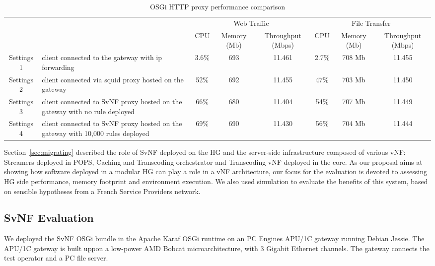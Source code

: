 \begin{table}
	\centering
	\begin{tabular}{| c | p{}|c |c |c || c |c |c |}
	
	
 	    \multicolumn{2}{c}{} & \multicolumn{3}{c}{Web Traffic} 		  & \multicolumn{3}{c}{File Transfer} \\
 	     \cline{3-8}	
             \multicolumn{2}{c|}{} & CPU 			& Memory (Mb) 		& Throughput (Mbps)	& CPU 		& Memory (Mb)		& Throughput (Mbps) \\\hline   
Settings 1 & client connected to the gateway with ip forwarding &   3.6\% 		& 693 		& 11.461		& 2.7\%		& 708 Mb		& 11.455 \\\hline
Settings 2 & client connected via squid proxy hosted on the gateway   &   52\%        & 692 		& 11.455		& 47\%		& 703 Mb		& 11.450 \\\hline
Settings 3 & client connected to SvNF proxy hosted on the gateway with no rule deployed &   66\%		& 680 		& 11.404		& 54\%		& 707 Mb		& 11.449 \\\hline
Settings 4 & client connected to SvNF proxy hosted on the gateway with 10,000 rules deployed   &   69\%        & 690 		& 11.430		& 56\%		& 704 Mb		& 11.444 \\\hline
	
	            
	\end{tabular}
	\caption{
	OSGi HTTP proxy performance comparison
	\label{tab:perf-comparison}
	}
	
\end{table}

Section~\ref{sec:migrating} described the role of SvNF deployed on the HG and the server-side infrastructure composed of various vNF: Streamers deployed in POPS, Caching and Transcoding orchestrator and Transcoding vNF deployed in the core.
As our proposal aims at showing how software deployed in a modular HG can play a role in a vNF architecture, our focus for the evaluation is devoted to assessing HG side performance, memory footprint and environment execution. We also used simulation to evaluate the benefits of this system, based on sensible hypotheses from a French Service Providers network.


\subsection{SvNF Evaluation }\label{Testbed}

We deployed the SvNF OSGi bundle in the Apache Karaf OSGi runtime on an PC Engines APU/1C gateway running Debian Jessie. 
The APU/1C gateway is built uppon a low-power AMD Bobcat microarchitecture, with 3 Gigabit Ethernet channels. The gateway connects the test operator and a PC file server.


